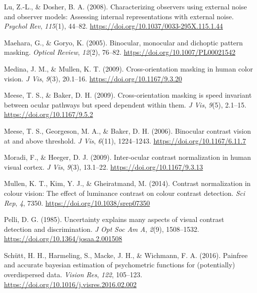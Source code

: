 \documentclass[
  letterpaper,
  DIV=11,
  numbers=noendperiod]{scrartcl}
\newlength{\cslhangindent}
\newlength{\cslentryspacingunit} %
\newenvironment{CSLReferences}[2] %
 {%
  \setlength{\parindent}{0pt}
  \ifodd #1
  \let\oldpar\par
  \def\par{\hangindent=\cslhangindent\oldpar}
  \fi
  \setlength{\parskip}{#2\cslentryspacingunit}
 }%
 {}
\begin{document}
\begin{CSLReferences}{1}{0}
\leavevmode{}%
Lu, Z.-L., \& Dosher, B. A. (2008). Characterizing observers using
external noise and observer models: Assessing internal representations
with external noise. \emph{Psychol Rev}, \emph{115}(1), 44--82.
\url{https://doi.org/10.1037/0033-295X.115.1.44}

\leavevmode{}%
Maehara, G., \& Goryo, K. (2005). Binocular, monocular and dichoptic
pattern masking. \emph{Optical Review}, \emph{12}(2), 76--82.
\url{https://doi.org/10.1007/PL00021542}

\leavevmode{}%
Medina, J. M., \& Mullen, K. T. (2009). Cross-orientation masking in
human color vision. \emph{J Vis}, \emph{9}(3), 20.1--16.
\url{https://doi.org/10.1167/9.3.20}

\leavevmode{}%
Meese, T. S., \& Baker, D. H. (2009). Cross-orientation masking is speed
invariant between ocular pathways but speed dependent within them.
\emph{J Vis}, \emph{9}(5), 2.1--15. \url{https://doi.org/10.1167/9.5.2}

\leavevmode{}%
Meese, T. S., Georgeson, M. A., \& Baker, D. H. (2006). Binocular
contrast vision at and above threshold. \emph{J Vis}, \emph{6}(11),
1224--1243. \url{https://doi.org/10.1167/6.11.7}

\leavevmode{}%
Moradi, F., \& Heeger, D. J. (2009). Inter-ocular contrast normalization
in human visual cortex. \emph{J Vis}, \emph{9}(3), 13.1--22.
\url{https://doi.org/10.1167/9.3.13}

\leavevmode{}%
Mullen, K. T., Kim, Y. J., \& Gheiratmand, M. (2014). Contrast
normalization in colour vision: The effect of luminance contrast on
colour contrast detection. \emph{Sci Rep}, \emph{4}, 7350.
\url{https://doi.org/10.1038/srep07350}

\leavevmode{}%
Pelli, D. G. (1985). Uncertainty explains many aspects of visual
contrast detection and discrimination. \emph{J Opt Soc Am A},
\emph{2}(9), 1508--1532. \url{https://doi.org/10.1364/josaa.2.001508}

\leavevmode{}%
Schütt, H. H., Harmeling, S., Macke, J. H., \& Wichmann, F. A. (2016).
Painfree and accurate bayesian estimation of psychometric functions for
(potentially) overdispersed data. \emph{Vision Res}, \emph{122},
105--123. \url{https://doi.org/10.1016/j.visres.2016.02.002}


\end{CSLReferences}
\end{document}
